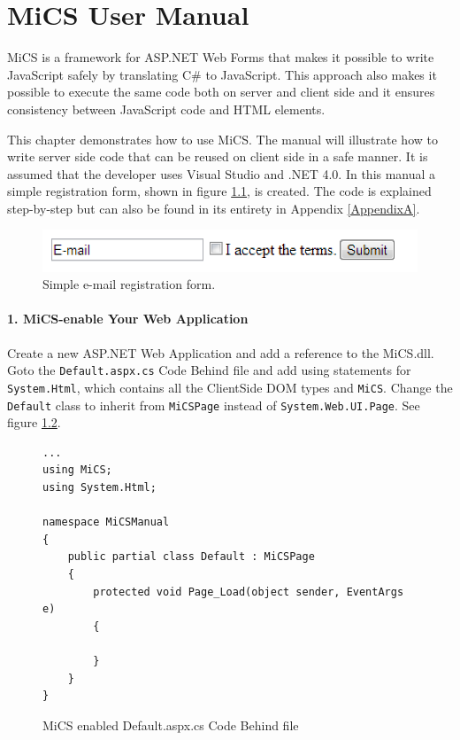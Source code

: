 \chapter{MiCS User Manual}
\label{chap:mics_manual}
MiCS is a framework for ASP.NET Web Forms that makes it possible to write JavaScript safely by translating C\# to JavaScript. This approach also makes it possible to execute the same code both on server and client side and it ensures consistency between JavaScript code and HTML elements.

This chapter demonstrates how to use MiCS. The manual will illustrate how to write server side code that can be reused on client side in a safe manner. It is assumed that the developer uses Visual Studio and .NET 4.0. In this manual a simple registration form, shown in figure \ref{fig:manual_registrationform}, is created. The code is explained step-by-step but can also be found in its entirety in Appendix \ref{AppendixA}.

\begin{figure}[H]
	\begin{center}
		\centerline{\includegraphics[width=12cm]{resources/images/manual_registrationform.png}}
	\end{center}
	\caption{Simple e-mail registration form.}
	\label{fig:manual_registrationform}
\end{figure}


\subsubsection{1. MiCS-enable Your Web Application} %
\label{ssub:mics_enable_your_web_application}
Create a new ASP.NET Web Application and add a reference to the MiCS.dll. Goto the \texttt{Default.aspx.cs} Code Behind file and add using statements for \texttt{System.Html}, which contains all the ClientSide DOM types and \texttt{MiCS}. Change the \texttt{Default} class to inherit from \texttt{MiCSPage} instead of \texttt{System.Web.UI.Page}. See figure \ref{fig:mics_enable_web_application}.
\begin{figure}[H]
\begin{lstlisting}[language=CSharp,classoffset=1,morekeywords={Default,MiCSPage,Button,CheckBox,TextBox,EventArgs,ClientSide,InputElement,Document,CheckBoxElement,Window,MixedSide,Regex}]
...
using MiCS;
using System.Html;

namespace MiCSManual
{
    public partial class Default : MiCSPage
    {
        protected void Page_Load(object sender, EventArgs e)
        {
   
        }
    }
}
\end{lstlisting}
\caption{MiCS enabled Default.aspx.cs Code Behind file}
\label{fig:mics_enable_web_application}
\end{figure}

